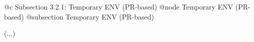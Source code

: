 @c Subsection 3.2.1: Temporary ENV (PR-based)
@node Temporary ENV (PR-based)
@subsection Temporary ENV (PR-based)

(...)
